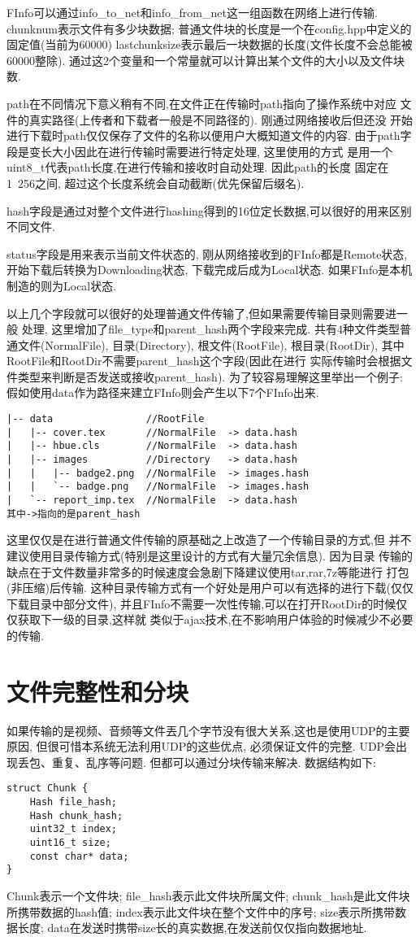 FInfo可以通过info\_to\_net和info\_from\_net这一组函数在网络上进行传输.
chunknum表示文件有多少块数据;
普通文件块的长度是一个在config.hpp中定义的固定值(当前为60000)
lastchunksize表示最后一块数据的长度(文件长度不会总能被60000整除).
通过这2个变量和一个常量就可以计算出某个文件的大小以及文件块数.

path在不同情况下意义稍有不同,在文件正在传输时path指向了操作系统中对应
文件的真实路径(上传者和下载者一般是不同路径的). 刚通过网络接收后但还没
开始进行下载时path仅仅保存了文件的名称以便用户大概知道文件的内容.
由于path字段是变长大小因此在进行传输时需要进行特定处理, 这里使用的方式
是用一个uint8\_t代表path长度,在进行传输和接收时自动处理. 因此path的长度
固定在1~256之间, 超过这个长度系统会自动截断(优先保留后缀名).

hash字段是通过对整个文件进行hashing得到的16位定长数据,可以很好的用来区别
不同文件.

status字段是用来表示当前文件状态的, 刚从网络接收到的FInfo都是Remote状态,
开始下载后转换为Downloading状态, 下载完成后成为Local状态. 
如果FInfo是本机制造的则为Local状态.

以上几个字段就可以很好的处理普通文件传输了,但如果需要传输目录则需要进一般
处理, 这里增加了file\_type和parent\_hash两个字段来完成.
共有4种文件类型普通文件(NormalFile), 目录(Directory), 根文件(RootFile),
根目录(RootDir), 其中RootFile和RootDir不需要parent\_hash这个字段(因此在进行
实际传输时会根据文件类型来判断是否发送或接收parent\_hash).
为了较容易理解这里举出一个例子:
假如使用data作为路径来建立FInfo则会产生以下7个FInfo出来.
\begin{verbatim}
|-- data  				//RootFile
|   |-- cover.tex   	//NormalFile  -> data.hash
|   |-- hbue.cls		//NormalFile  -> data.hash
|   |-- images			//Directory   -> data.hash
|   |   |-- badge2.png 	//NormalFile  -> images.hash
|   |   `-- badge.png 	//NormalFile  -> images.hash
|   `-- report_imp.tex	//NormalFile  -> data.hash	
其中->指向的是parent_hash
\end{verbatim}
这里仅仅是在进行普通文件传输的原基础之上改造了一个传输目录的方式,但
并不建议使用目录传输方式(特别是这里设计的方式有大量冗余信息). 因为目录
传输的缺点在于文件数量非常多的时候速度会急剧下降建议使用tar,rar,7z等能进行
打包(非压缩)后传输.
这种目录传输方式有一个好处是用户可以有选择的进行下载(仅仅下载目录中部分文件),
并且FInfo不需要一次性传输,可以在打开RootDir的时候仅仅获取下一级的目录,这样就
类似于ajax技术,在不影响用户体验的时候减少不必要的传输.


\section{文件完整性和分块}
如果传输的是视频、音频等文件丟几个字节没有很大关系,这也是使用UDP的主要原因,
但很可惜本系统无法利用UDP的这些优点, 必须保证文件的完整.
UDP会出现丢包、重复、乱序等问题.
但都可以通过分块传输来解决.
数据结构如下:
\begin{lstlisting}
struct Chunk {
	Hash file_hash;
	Hash chunk_hash;
	uint32_t index;
	uint16_t size;
	const char* data;
}
\end{lstlisting}
Chunk表示一个文件块;
file\_hash表示此文件块所属文件;
chunk\_hash是此文件块所携带数据的hash值;
index表示此文件块在整个文件中的序号;
size表示所携带数据长度;
data在发送时携带size长的真实数据,在发送前仅仅指向数据地址.


